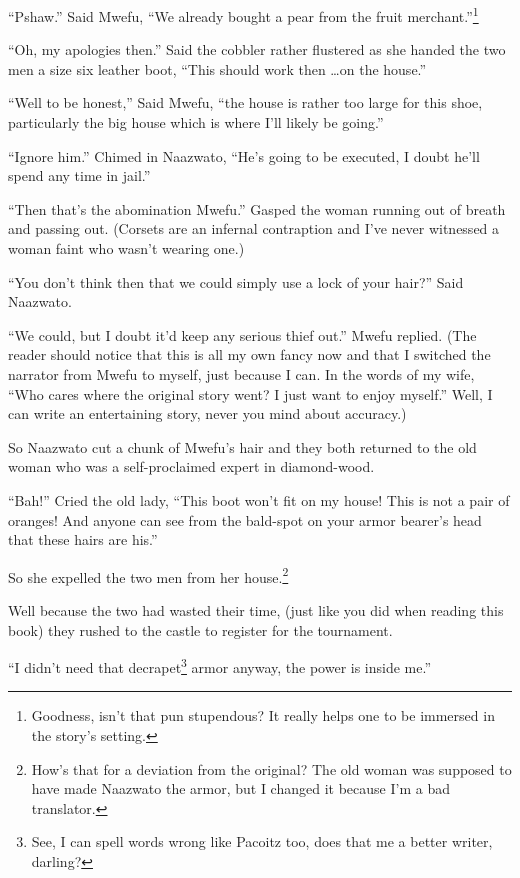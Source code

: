 ``Pshaw.'' Said Mwe\-fu, ``We already bought a pear from the fruit merchant.''\footnote{Goodness, isn't that pun stupendous? It really helps one to be immersed in the story's setting.}

``Oh, my apologies then.'' Said the cobbler rather flustered as she handed the two men a size six leather boot, ``This should work then \ldots on the house.''

``Well to be honest,'' Said Mwe\-fu, ``the house is rather too large for this shoe, particularly the big house which is where I'll likely be going.''

``Ignore him.'' Chimed in Naa\-zwa\-to, ``He's going to be executed, I doubt he'll spend any time in jail.''

``Then that's the abomination Mwe\-fu.'' Gasped the woman running out of breath and passing out. (Corsets are an infernal contraption and I've never witnessed a woman faint who wasn't wearing one.)

``You don't think then that we could simply use a lock of your hair?'' Said Naa\-zwa\-to.

``We could, but I doubt it'd keep any serious thief out.'' Mwe\-fu replied. (The reader should notice that this is all my own fancy now and that I switched the narrator from Mwe\-fu to myself, just because I can. In the words of my wife, ``Who cares where the original story went? I just want to enjoy myself.'' Well, I can write an entertaining story, never you mind about accuracy.)

So Naa\-zwa\-to cut a chunk of Mwe\-fu's hair and they both returned to the old woman who was a self-proclaimed expert in diamond-wood.

``Bah!'' Cried the old lady, ``This boot won't fit on my house! This is not a pair of oranges! And anyone can see from the bald-spot on your armor bearer's head that these hairs are his.''

So she expelled the two men from her house.\footnote{How's that for a deviation from the original? The old woman was supposed to have made Naa\-zwa\-to the armor, but I changed it because I'm a bad translator.}

Well because the two had wasted their time, (just like you did when reading this book) they rushed to the castle to register for the tournament.

``I didn't need that decrapet\footnote{See, I can spell words wrong like Pa\-co\-itz too, does that me a better writer, darling?} armor anyway, the power is inside me.''

